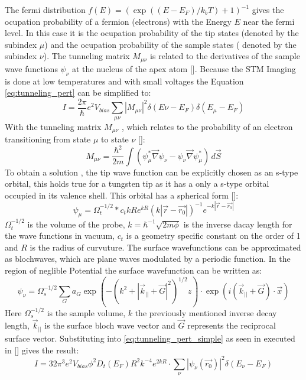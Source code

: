\noindent The fermi distribution $f(E)= (\exp((E-E_F)/k_b T)+1)^{-1}$ gives the ocupation probability of a fermion (electrons) with the Energy $E$ near the fermi level.
In this case it is the ocupation probability of the tip states (denoted by the subindex $\mu$) and the ocupation probability of the sample states ( denoted by the subindex $\nu$).
The tunneling matrix $M_{\mu \nu}$ is related to the derivatives of the sample wave functions $\psi_{\nu} $ at the nucleus of the apex atom [\cite{tunnelmatrix}].
Because the STM Imaging is done at low temperatures and with small voltages the Equation \ref{eq:tunneling_pert} can be simplified to:
\begin{equation}
    I = \frac{2 \pi}{\hbar} e^2 V_{bias} \sum_{\mu \nu}  |M_{\mu \nu}|^2 \delta(E{\nu}-E_F) \delta(E_{\mu}- E_{F})
    \label{eq:tunneling_pert_simple}
\end{equation}
With the tunneling matrix $M_{\mu \nu}$ , which relates to the probability of an electron transitioning from state $\mu$ to state $\nu$ [\cite{tunnelmatrix}]: 
\begin{equation}
    M_{\mu \nu} = \frac{\hbar^2}{2m} \int (\psi_{\mu}^{*} \vec{\nabla} \psi_{\nu} - \psi_{\nu} \vec{\nabla} \psi_{\mu}^{*}) \, d\vec{S}
    \label{eq:tunnelin_matrix}
\end{equation}
To obtain a solution  , the tip wave function can be explicitly chosen as an s-type orbital, this holds true for a tungsten tip as it has a only a s-type orbital occupied in its valence shell.
This orbital has a spherical form [\cite{PhysRevLett}]:
\begin{equation}
    \psi_{\mu} = \Omega_t^{-1/2} * c_t k R e^{kR} ( k|\vec{r}- \vec{r_0}|)^{-1} e^{-k|\vec{r}- \vec{r_0}|}
    \label{eq:tip_wave}
\end{equation}
$\Omega_t^{-1/2}$ is the volume of the probe, $k = \hbar^{-1} \sqrt{2m\phi}$ is the inverse dacay length for the wave functions in vacuum, $c_t$ is a geometry specific constant on the order of 1 and $R$ is the radius of curvuture.
The surface wavefunctions can be approximated as blochwaves, which are plane waves modulated by a periodic function.
In the region of neglible Potential the surface wavefunction can be written as:
\begin{equation}
    \psi_{\nu} = \Omega_{s}^{-1/2} \sum_{G} a_G \exp(- (k^2 + |\vec{k}_{||} + \vec{G}|^2)^{1/2} z)\cdot \exp(i(\vec{k}_{||} + \vec{G})\cdot \vec{x})
    \label{eq:surface_wave}
\end{equation}
Here $\Omega_{s}^{-1/2}$ is the sample volume, $k$ the previously mentioned inverse decay length, $\vec{k}_{||}$ is the surface bloch wave vector and $\vec{G}$ represents the reciprocal surface vector.
Substituting into \ref{eq:tunneling_pert_simple} as seen in executed in [\cite{PhysRevLett}] gives the result:
\begin{equation}
    I = 32 \pi^3e^2 V_{bias}\phi^2 D_t(E_F)R^2 k^{-4} e^{2kR} \cdot \sum_{\nu} |\psi_{\nu}(\vec{r_0})|^2 \delta(E_{\nu} - E_F) 
\end{equation}


